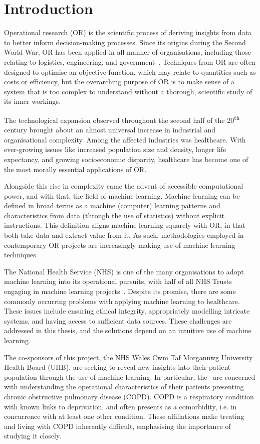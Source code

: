 \chapter{Introduction}
\label{chp:intro}

Operational research (OR) is the scientific process of deriving insights from
data to better inform decision-making processes. Since its origins during the
Second World War, OR has been applied in all manner of organisations, including
those relating to logistics, engineering, and government~\cite{Hillier2005}.
Techniques from OR are often designed to optimise an objective function, which
may relate to quantities such as costs or efficiency, but the overarching
purpose of OR is to make sense of a system that is too complex to understand
without a thorough, scientific study of its inner workings.

The technological expansion observed throughout the second half of the
20\textsuperscript{th} century brought about an almost universal increase in
industrial and organisational complexity. Among the affected industries was
healthcare. With ever-growing issues like increased population size and density,
longer life expectancy, and growing socioeconomic disparity, healthcare has
become one of the most morally essential applications of OR.

Alongside this rise in complexity came the advent of accessible computational
power, and with that, the field of machine learning. Machine learning can be
defined in broad terms as a machine (computer) learning patterns and
characteristics from data (through the use of statistics) without explicit
instructions. This definition aligns machine learning squarely with OR, in that
both take data and extract value from it. As such, methodologies employed in
contemporary OR projects are increasingly making use of machine learning
techniques.

The National Health Service (NHS) is one of the many organisations to adopt
machine learning into its operational pursuits, with half of all NHS Trusts
engaging in machine learning projects~\cite{Hughes2019}. Despite its promise,
there are some commonly occurring problems with applying machine learning to
healthcare. These issues include ensuring ethical integrity, appropriately
modelling intricate systems, and having access to sufficient data sources. These
challenges are addressed in this thesis, and the solutions depend on an
intuitive use of machine learning.

The co-sponsors of this project, the NHS Wales Cwm Taf Morgannwg University
Health Board (UHB), are seeking to reveal new insights into their patient
population through the use of machine learning. In particular, the \ctmuhb\ are
concerned with understanding the operational characteristics of their patients
presenting chronic obstructive pulmonary disease (COPD). COPD is a respiratory
condition with known links to deprivation, and often presents as a comorbidity,
i.e. in concurrence with at least one other condition. These affiliations make
treating and living with COPD inherently difficult, emphasising the importance
of studying it closely.

